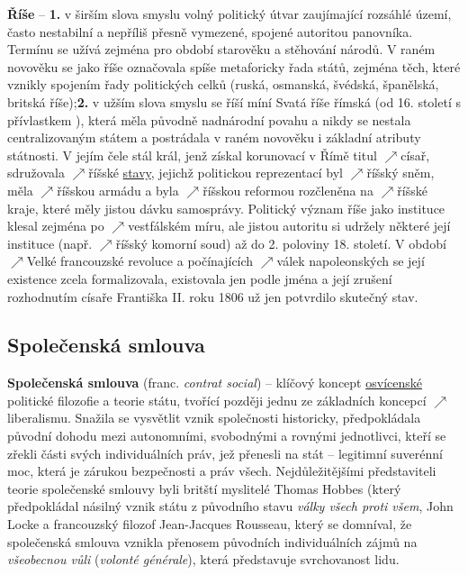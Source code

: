 \documentclass{article}
\begin{document}
  {\bf Říše} -- {\bf 1.} v širším slova smyslu volný politický útvar zaujímající rozsáhlé území, často nestabilní a nepříliš přesně vymezené, spojené autoritou panovníka. Termínu se užívá zejména pro období starověku a stěhování národů. V raném novověku se jako říše označovala spíše metaforicky řada států, zejména těch, které vznikly spojením řady politických celků (ruská, osmanská, švédská, španělská, britská říše);{\bf 2.} v užším slova smyslu se říší míní Svatá říše římská (od 16. století s přívlastkem ), která měla původně nadnárodní povahu a nikdy se nestala centralizovaným státem a postrádala v raném novověku i základní atributy státnosti. V jejím čele stál král, jenž získal korunovací v Římě titul $\nearrow$císař, sdružovala $\nearrow$říšské \hyperref[sec:stavy]{stavy}, jejichž politickou reprezentací byl $\nearrow$říšský sněm, měla $\nearrow$říšskou armádu a byla $\nearrow$říšskou reformou rozčleněna na $\nearrow$říšské kraje, které měly jistou dávku samosprávy. Politický význam říše jako instituce klesal zejména po $\nearrow$vestfálském míru, ale jistou autoritu si udržely některé její instituce (např. $\nearrow$říšský komorní soud) až do 2. poloviny 18. století. V období $\nearrow$Velké francouzské revoluce a počínajících $\nearrow$válek napoleonských se její existence zcela formalizovala, existovala jen podle jména a její zrušení rozhodnutím císaře Františka II. roku 1806 už jen potvrdilo skutečný stav.

  \subsection*{Společenská smlouva~\cite{Hroch:}}
  \label{sec:spolecenskaSmlouva}

  {\bf Společenská smlouva} (franc. {\it contrat social}) -- klíčový koncept \hyperref[sec:osvicenstvi]{osvícenské} politické filozofie a teorie státu, tvořící později jednu ze základních koncepcí $\nearrow$liberalismu. Snažila se vysvětlit vznik společnosti historicky, předpokládala původní dohodu mezi autonomními, svobodnými a rovnými jednotlivci, kteří se zřekli části svých individuálních práv, jež přenesli na stát -- legitimní suverénní moc, která je zárukou bezpečnosti a práv všech. Nejdůležitějšími představiteli teorie společenské smlouvy byli britští myslitelé Thomas Hobbes (který předpokládal násilný vznik státu z původního stavu {\it války všech proti všem}, John Locke a francouzský filozof Jean-Jacques Rousseau, který se domníval, že společenská smlouva vznikla přenosem původních individuálních zájmů na {\it všeobecnou vůli} ({\it volonté générale}), která představuje svrchovanost lidu.
\end{document}
